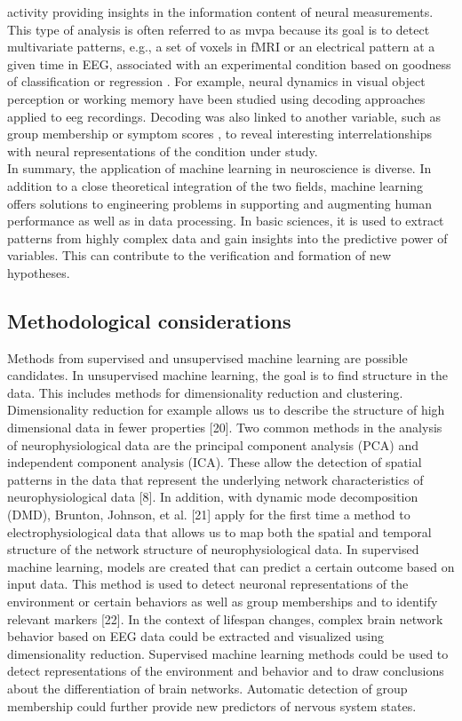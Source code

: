 activity providing insights in the information content of neural measurements. This type of analysis is often referred to as \gls{mvpa} because its goal is to detect multivariate patterns, e.g., a set of voxels in fMRI or an electrical pattern at a given time in EEG, associated with an experimental condition based on goodness of classification or regression \cite{Holdgraf2017}. For example, neural dynamics in visual object perception \cite{Cauchoix2014} or working memory \cite{Bae2018} have been studied using decoding approaches applied to \gls{eeg} recordings. Decoding was also linked to another variable, such as group membership \cite{Csizmadia2021, Bae2020} or symptom scores \cite{Coutanche2011} , to reveal interesting interrelationships with neural representations of the condition under study.\\
In summary, the application of machine learning in neuroscience is diverse. In addition to a close theoretical integration of the two fields, machine learning offers solutions to engineering problems in supporting and augmenting human performance as well as in data processing. In basic sciences, it is used to extract patterns from highly complex data and gain insights into the predictive power of variables. This can contribute to the verification and formation of new hypotheses.


\subsection{Methodological considerations}
Methods from supervised and unsupervised machine learning are possible candidates. In unsupervised machine learning, the goal is to find structure in the data. This includes methods for dimensionality reduction and clustering. Dimensionality reduction for example allows us to describe the structure of high dimensional data in fewer properties [20]. Two common methods in the analysis of neurophysiological data are the principal component analysis (PCA) and independent component analysis (ICA). These allow the detection of spatial patterns in the data that represent the underlying network characteristics of neurophysiological data [8]. In addition, with dynamic mode decomposition (DMD), Brunton, Johnson, et al. [21] apply for the first time a method to electrophysiological data that allows us to map both the spatial and temporal structure of the network structure of neurophysiological data.
In supervised machine learning, models are created that can predict a certain outcome based on input data. This method is used to detect neuronal representations of the environment or certain behaviors as well as group memberships and to identify relevant markers [22].
In the context of lifespan changes, complex brain network behavior based on EEG data could be extracted and visualized using dimensionality reduction. Supervised machine learning methods could be used to detect representations of the environment and behavior and to draw conclusions about the differentiation of brain networks. Automatic detection of group membership could further provide new predictors of nervous system states.

